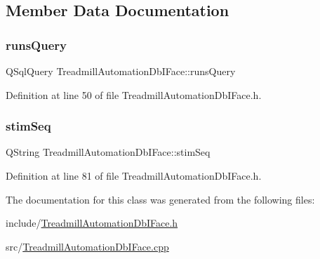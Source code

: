 \subsection{Member Data Documentation}
\mbox{\label{class_treadmill_automation_db_i_face_a449bbbbb5aa67ba7dfdb993f5033251a}} 
\subsubsection{\texorpdfstring{runs\+Query}{runsQuery}}
{\footnotesize\ttfamily Q\+Sql\+Query Treadmill\+Automation\+Db\+I\+Face\+::runs\+Query}



Definition at line 50 of file Treadmill\+Automation\+Db\+I\+Face.\+h.

\mbox{\label{class_treadmill_automation_db_i_face_a080ba221870f3fa6222afd2b9df625a7}} 
\subsubsection{\texorpdfstring{stim\+Seq}{stimSeq}}
{\footnotesize\ttfamily Q\+String Treadmill\+Automation\+Db\+I\+Face\+::stim\+Seq}



Definition at line 81 of file Treadmill\+Automation\+Db\+I\+Face.\+h.



The documentation for this class was generated from the following files\+:\begin{DoxyCompactItemize}
\item 
include/\hyperlink{_treadmill_automation_db_i_face_8h}{Treadmill\+Automation\+Db\+I\+Face.\+h}\item 
src/\hyperlink{_treadmill_automation_db_i_face_8cpp}{Treadmill\+Automation\+Db\+I\+Face.\+cpp}\end{DoxyCompactItemize}
